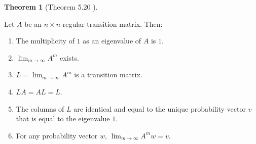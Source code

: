 \documentclass{amsart}
\theoremstyle{definition}
\newtheorem{theorem}{Theorem}
\theoremstyle{remark}
\numberwithin{equation}{section}
\begin{document}
\begin{theorem}[Theorem 5.20 \cite{friedberg2003linear}] \label{theorem520}

Let $A$ be an $n \times n$ regular transition matrix. Then:

\begin{enumerate}

	\item The multiplicity of $1$ as an eigenvalue of $A$ is $1$.

	\item $\lim_{m \to \infty} A^m$ exists.

	\item $L = \lim_{m \to \infty} A^m$ is a transition matrix.

	\item $LA = AL = L$.

	\item The columns of $L$ are identical and equal to the unique probability vector $v$ that is equal to the eigenvalue $1$.

	\item For any probability vector $w$, $\lim_{m \to \infty} A^m w = v$.

\end{enumerate}

\end{theorem}
\end{document}
